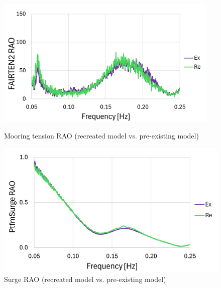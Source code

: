 \documentclass[a4paper, 11pt]{article}
\begin{document}
\begin{figure}[H]
    \begin{minipage}{0.48\textwidth}
        \centering
        \includegraphics[width=0.95\textwidth]{2.6_ten_mine_1.png}
        \caption{\small Mooring tension RAO (recreated model vs. pre-existing model)}
        \label{fig:2.6_ten_mine_recreated}
    \end{minipage}
    \hfill
    \begin{minipage}{0.48\textwidth}
        \centering
        \includegraphics[width=1\textwidth]{2.6_surge_mine_1.png}
        \caption{\small Surge RAO (recreated model vs. pre-existing model)} 
        \label{fig:2.6_surge_mine_recreated}
    \end{minipage}
\end{figure}
\end{document}
